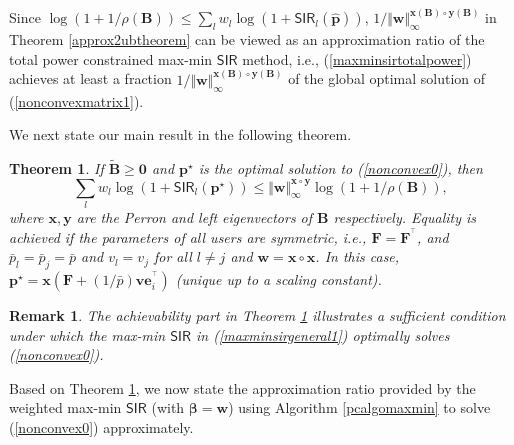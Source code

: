 \documentclass[10pt,twocolumn]{IEEEtran}
\newcommand{\0}{\mathbf{0}}
\newcommand{\1}{\mathbf{1}}
\newcommand{\trans}{^\top}
\newtheorem{theorem}{Theorem}
\newtheorem{remark}{Remark}
\begin{document}
Since $\log \left( 1 + 1/\rho(\mathbf{B}) \right) \le \sum_l w_l \log(1+\mathsf{SIR}_l(\mathbf{\widehat{p}}))$, $1/\Vert \mathbf{w} \Vert^{\mathbf{x}(\mathbf{B}) \circ \mathbf{y}(\mathbf{B})}_{\infty}$ in Theorem \ref{approx2ubtheorem} can be viewed as an approximation ratio of the total power constrained max-min $\mathsf{SIR}$ method, i.e., (\ref{maxminsirtotalpower}) achieves at least a fraction $1/\Vert \mathbf{w} \Vert^{\mathbf{x}(\mathbf{B}) \circ \mathbf{y}(\mathbf{B})}_{\infty}$ of the global optimal solution of (\ref{nonconvexmatrix1}).

We next state our main result in the following theorem.
\begin{theorem}
\label{mainthm}
If $\mathbf{\tilde{B}}  \ge \mathbf{0}$ and $\mathbf{p}^{\star}$ is the optimal solution to (\ref{nonconvex0}), then
\begin{equation}
\label{mainthmeqn}
\sum_l w_l \log(1+\mathsf{SIR}_l(\mathbf{p}^{\star})) \le \Vert \mathbf{w} \Vert^{\mathbf{x} \circ \mathbf{y}}_{\infty} \log \left( 1 + 1/\rho(\mathbf{B})\right),
\end{equation}
where $\mathbf{x},\mathbf{y}$ are the Perron and left eigenvectors of $\mathbf{B}$ respectively. 
\newline
Equality is achieved if the parameters of all users are symmetric, i.e., $\mathbf{F}=\mathbf{F}^{\trans}$, and $\bar{p}_l = \bar{p}_j=\bar{p}$ and $v_l = v_j$ for all $l \ne j$ and $\mathbf{w}=\mathbf{x} \circ \mathbf{x}$. In this case, $\mathbf{p}^{\star}=\mathbf{x}(\mathbf{F}+(1/\bar{p})\mathbf{v}\mathbf{e}_i^{\trans})$ (unique up to a scaling constant).
\end{theorem}

\begin{remark}
The achievability part in Theorem \ref{mainthm} illustrates a sufficient condition under which the max-min $\mathsf{SIR}$ in (\ref{maxminsirgeneral1}) optimally solves (\ref{nonconvex0}).
\end{remark}

Based on Theorem \ref{mainthm}, we now state the approximation ratio provided by the weighted max-min $\mathsf{SIR}$ (with $\boldsymbol{\beta}=\mathbf{w}$) using Algorithm \ref{pcalgomaxmin} to solve (\ref{nonconvex0}) approximately. 
\end{document}
